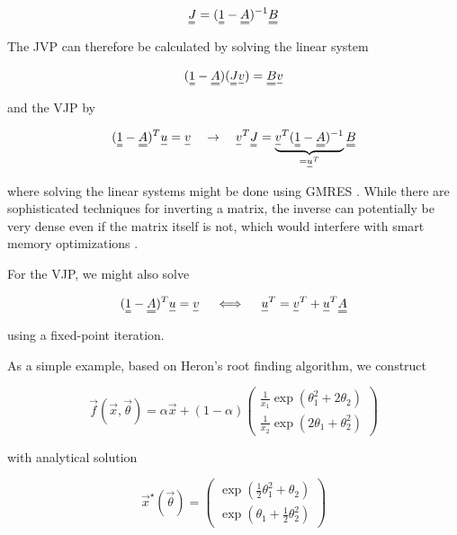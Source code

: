 \begin{equation}
    \mat{J} = (\mat{1} - \mat{A})^{-1} \mat{B}
\end{equation}

The JVP can therefore be calculated by solving the linear system

\begin{equation}
    (\mat{1} - \mat{A}) (\mat{J} \vec{v}) = \mat{B} \vec{v}
    \label{eq:jvp_fixed}
\end{equation}

and the VJP by

\begin{equation}
     (\mat{1} - \mat{A})^T \vec{u} = \vec{v} \quad \rightarrow \quad \vec{v}^T \mat{J} = \underbrace{\vec{v}^T (\mat{1} - \mat{A})^{-1}}_{=\vec{u}^T} \mat{B}
    \label{eq:vjp_fixed}
\end{equation}

where solving the linear systems might be done using GMRES \citep{GMRES}. While there 
are sophisticated techniques for inverting a matrix, the inverse can potentially be very dense even if
the matrix itself is not, which would interfere with smart memory optimizations \citep{rackauckas22}.

For the VJP, we might also solve

\begin{equation}
    (\mat{1} - \mat{A})^T \vec{u} = \vec{v} \quad \iff \quad \vec{u}^T = \vec{v}^T + \vec{u}^T \mat{A}
    \label{eq:vjp_fixed_point}
\end{equation}

using a fixed-point iteration.

As a simple example, based on Heron's root finding algorithm, we construct

\begin{equation}
    \vec{f}(\vec{x}, \vec{\theta}) = \alpha \vec{x} + (1-\alpha) \begin{pmatrix}
        \frac{1}{x_1} \exp{(\theta_1^2 + 2\theta_2)} \\
        \frac{1}{x_2} \exp{(2\theta_1 + \theta_2^2)}
    \end{pmatrix}
    \label{eq:example_fixed_point_equation}
\end{equation}

with analytical solution

\begin{equation}
    \vec{x}^\star(\vec{\theta}) = \begin{pmatrix}
        \exp{(\frac{1}{2}\theta_1^2 + \theta_2)} \\
        \exp{(\theta_1 + \frac{1}{2}\theta_2^2)}
    \end{pmatrix}
    \label{eq:example_fixed_point}
\end{equation}

